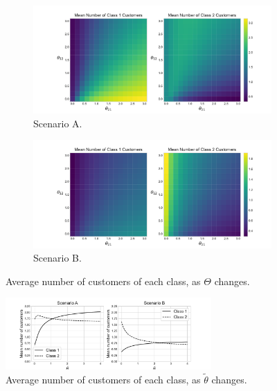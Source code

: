 \documentclass{article}
\begin{document}
\begin{figure}
  \begin{center}
  \begin{subfigure}[b]{0.49\textwidth}
    \includegraphics[width=\textwidth]{img/vary_thetas_meancusts_scen1.pdf}
    \caption{Scenario A.}
    \label{fig:meancusts_A}
  \end{subfigure}
  \begin{subfigure}[b]{0.49\textwidth}
    \includegraphics[width=\textwidth]{img/vary_thetas_meancusts_scen2.pdf}
    \caption{Scenario B.}
    \label{fig:meancusts_B}
  \end{subfigure}
  \caption{Average number of customers of each class, as $\Theta$ changes.}
  \end{center}
\end{figure}

\begin{figure}
  \begin{center}
    \includegraphics[width=0.7\textwidth]{img/mean_custs_equal_theta.pdf}
  \end{center}
  \caption{Average number of customers of each class, as $\tilde{\theta}$
  changes.}
  \label{fig:theta_magnitude}
\end{figure}
\end{document}
